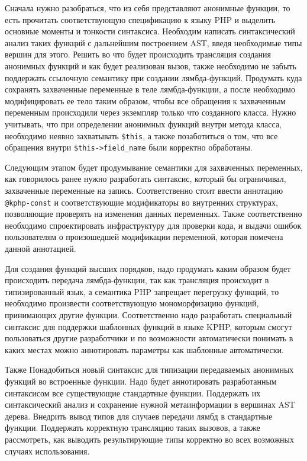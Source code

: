 Сначала нужно разобраться, что из себя представляют анонимные функции, то есть прочитать соответствующую спецификацию к языку PHP и выделить основные моменты и тонкости синтаксиса.
Необходим написать синтаксический анализ таких функций с дальнейшим построением AST, введя необходимые типы вершин для этого.
Решить во что будет происходить трансляция создания анонимных функций и как будет реализован вызов, также необходимо не забыть поддержать ссылочную семантику при создании лямбда-функций.
Продумать куда сохранять захваченные переменные в теле лямбда-функции, а после необходимо модифицировать ее тело таким образом, чтобы все обращения к захваченным переменным происходили через экземпляр только что созданного класса.
Нужно учитывать, что при определении анонимных функций внутри метода класса, необходимо неявно захватывать \verb|$this|, а также позаботиться о том, что все обращения внутри \verb|$this->field_name| были корректно обработаны.

Следующим этапом будет продумывание семантики для захваченных переменных, как говорилось ранее нужно разработать синтаксис, который бы ограничивал, захваченные переменные на запись.
Соответственно стоит ввести аннотацию \verb|@kphp-const| и соответствующие модификаторы во внутренних структурах, позволяющие проверять на изменения данных переменных.
Также соответственно необходимо спроектировать инфраструктуру для проверки кода, и выдачи ошибок пользователям о произошедшей модификации переменной, которая помечена данной аннотацией.

Для создания функций высших порядков, надо продумать каким образом будет происходить передача лямбда-функции, так как трансляция происходит в типизированный язык, а семантика PHP запрещает перегрузку функций, то необходимо произвести соответствующую мономорфизацию функций, принимающих другие функции.
Соответственно надо разработать специальный синтаксис для поддержки шаблонных функций в языке KPHP, которым смогут пользоваться другие разработчики и по возможности автоматически понимать в каких местах можно аннотировать параметры как шаблонные автоматически.

Также Понадобиться новый синтаксис для типизации передаваемых анонимных функций во встроенные функции.
Надо будет аннотировать разработанным синтаксисом все существующие стандартные функции.
Поддержать их синтаксический анализ и сохранение нужной метаинформации в вершинах AST дерева.
Внедрить вывод типов для случаев передачи лямбд в стандартные функции.
Поддержать корректную трансляцию таких вызовов, а также рассмотреть, как выводить результирующие типы корректно во всех возможных случаях использования.


